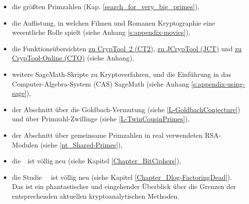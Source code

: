 \begin{itemize}
  \item die größten Primzahlen (Kap. \ref{search_for_very_big_primes}),
  \item die Auflistung, in welchen Filmen und Romanen Kryptographie eine
        wesentliche Rolle spielt (siehe Anhang \ref{s:appendix-movies}),
  \item die Funktionsübersichten
        \hyperlink{appendix-template-overview-CT2}{zu CrypTool~2 (CT2)},
        \hyperlink{appendix-function-overview-JCT}{zu JCrypTool (JCT)} und
        \hyperlink{appendix-function-overview-CTO}{zu CrypTool-Online (CTO)}
        (siehe Anhang),
  \item weitere SageMath-Skripte zu Kryptoverfahren, und die Einführung in das
        Computer-Algebra-System (CAS) SageMath (siehe
        Anhang \ref{s:appendix-using-sage}),
  \item der Abschnitt über die Goldbach-Vermutung
        (siehe \ref{L-GoldbachConjecture}) und über Primzahl-Zwillinge
        (siehe \ref{L-TwinCousinPrimes}),
  \item der Abschnitt über gemeinsame Primzahlen in real verwendeten
        RSA-Modulen (siehe \ref{nt_Shared-Primes}),
  \item die~\glqq {}\grqq~ist völlig neu
	(siehe Kapitel \ref{Chapter_BitCiphers}),

  \item die Studie ~\glqq {}\grqq~ist völlig neu
	(siehe Kapitel \ref{Chapter_Dlog-FactoringDead}). Das ist ein
	phantastischer und eingehender Überblick über die Grenzen der
	entsprechenden aktuellen kryptoanalytischen Methoden.
\end{itemize}

